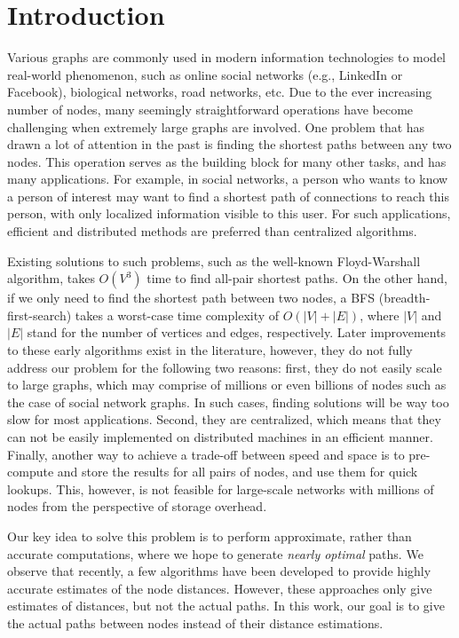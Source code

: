 \section{Introduction}
\label{intro}

Various graphs are commonly used in modern information technologies to model real-world phenomenon, such as online social networks (e.g.,
LinkedIn or Facebook), biological networks, road networks, etc. Due to the ever increasing number of nodes, many seemingly straightforward operations have become challenging when extremely large graphs are involved. One problem that has drawn a lot of attention in the past is finding the shortest paths between any two nodes. This operation serves as the
building block for many other tasks, and has many applications. For example, in social networks, a person who wants to know a person of interest may want to find a shortest path of connections to reach this person, with only localized information visible to this user. For such applications, efficient and distributed methods are preferred than centralized algorithms.

Existing solutions to such problems, such as the well-known Floyd-Warshall algorithm, takes $O(V^3)$ time to find all-pair shortest paths. On the other hand, if we only need to find the shortest path between two nodes, a BFS (breadth-first-search) takes a worst-case time complexity of $O(|V|+|E|)$, where $|V|$ and $|E|$ stand for the number of vertices and edges, respectively. Later improvements to these early algorithms exist in the literature, however, they do not fully address our problem for the following two reasons: first, they do not easily scale to large graphs, which may comprise of millions or even billions of nodes such as the case of social network graphs. In such cases, finding solutions will be way too slow for most applications. Second, they are centralized, which means that they can not be easily implemented on distributed machines in an efficient manner. Finally, another way to achieve a trade-off between speed and space is to pre-compute and store the results for all pairs of nodes, and use them for quick lookups. This, however, is not feasible for large-scale networks with millions of nodes from the perspective of storage overhead.

Our key idea to solve this problem is to perform approximate, rather than accurate computations, where we hope to generate \emph{nearly optimal} paths. We observe that recently, a few algorithms have been developed to provide highly accurate estimates of the node distances. However, these approaches only give estimates of distances, but not the actual paths. In this work, our goal is to give the actual paths between nodes instead of their distance estimations.


